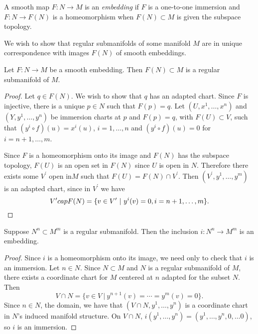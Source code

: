 \begin{defn}
A smooth map $F: N \to M$ is an \emph{embedding} if $F$ is a
one-to-one immersion and $F : N \to F(N)$ is a homeomorphism when
$F(N) \subset M$ is given the subspace topology.
\end{defn}

We wish to show that regular submanifolds of some manifold $M$ are in
unique correspondence with images $F(N)$ of smooth embeddings.

\begin{prop}
Let $F: N \to M$ be a smooth embedding. Then $F(N) \subset M$ is a
regular submanifold of $M$.
\end{prop}

\begin{proof}
Let $q \in F(N)$. We wish to show that $q$ has an adapted chart.
Since $F$ is injective, there is a unique $p \in N$ such that
$F(p) = q$. Let $(U, x^1, \dots, x^n)$ and $(Y, y^1, \dots, y^n)$ be
immersion charts at $p$ and $F(p) = q$, with $F(U) \subset V$, such that
$(y^i \circ f)(u) = x^i(u)$, $i = 1, \dots, n$
and $(y^i \circ f)(u) = 0$ for $i = n+1, \dots, m$.

Since $F$ is a homeomorphism onto its image and $F(N)$ has the
subspace topology, $F(U)$ is an open set in $F(N)$ since $U$ is open
in $N$. Therefore there exists some $V^\prime$ open in$M$ such that
$F(U) = F(N) \cap V^\prime$. Then $(V^\prime, y^1, \dots, y^m)$ is an
adapted chart, since in $V^\prime$ we have
$$
  V^\prime \\cap F(N)
= \{ v \in V^\prime ~\vert~ y^i(v) = 0, i = n+1, \dots, m \}.
$$
\end{proof}

\begin{prop}
Suppose $N^n \subset M^m$ is a regular submanifold. Then the inclusion
$i : N^n \to M^m$ is an embedding.
\end{prop}

\begin{proof}
Since $i$ is a homeomorphism onto its image, we need only to check
that $i$ is an immersion. Let $n \in N$. Since $N \subset M$ and $N$ is a regular
submanifold of $M$, there exists a coordinate chart for $M$ centered
at $n$ adapted for the subset $N$. Then
$$
  V \cap N
= \{ v \in V ~\vert~ y^{n+1}(v) = \cdots = y^m(v) = 0 \}.
$$
Since $n \in N$, the domain, we have that
$(V \cap N, y^1, \dots, y^n)$ is a coordinate chart in $N$'s induced
manifold structure. On $V \cap N$,
$i(y^1, \dots, y^n) = (y^1, \dots, y^n, 0, \dots 0)$, so $i$ is an immersion.
\end{proof}

